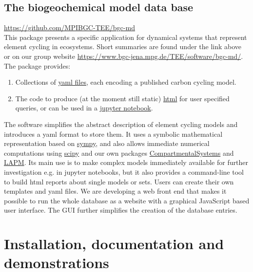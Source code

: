 \documentclass[a4paper]{article}
\begin{document}
\subsection{The biogeochemical model data base}
\url{https://github.com/MPIBGC-TEE/bgc-md}\\
This package presents a specific application for dynamical systems that represent element cycling in ecosystems.
Short summaries are found under the link above or on our group website \url{https://www.bgc-jena.mpg.de/TEE/software/bgc-md/}.
The package provides: 
\begin{enumerate} 
	\item
	Collections of \href{https://github.com/MPIBGC-TEE/bgc-md/tree/master/bgc_md/data/all_records}{yaml files}, each encoding a published carbon cycling model.  
	
	\item 
		The code to produce (at the moment still static) \href{https://www.bgc-jena.mpg.de/TEE/software/bgc-md/vegetation/list_report_v.html}{html} for user specified queries, or can be used in a \href{https://github.com/MPIBGC-TEE/bgc-md/blob/master/jupyter_notebooks/Examples/how_to_apply_toolkit_to_yaml_model.ipynb}{jupyter notebook}. 
\end{enumerate} 
The software simplifies the abstract description of element cycling models and introduces a yaml format to store them. It uses a symbolic mathematical representation based on \href{http://www.sympy.org/en/index.htmlhttp://www.sympy.org/en/index.html}{sympy}, and also allows immediate numerical computations using \href{https://scipy.org/}{scipy} and our own packages \href{https://github.com/MPIBGC-TEE/CompartmentalSystems}{CompartmentalSystems} and \href{https://github.com/MPIBGC-TEE/LAPM}{LAPM}. 
Its main use is to make complex models immediately available for further investigation e.g. in jupyter notebooks, but it also provides a command-line tool to build html reports about single models or sets. Users can create their own templates and yaml files.
We are developing a web front end that makes it possible to run the whole database as a website with a graphical JavaScript based user interface. The GUI further simplifies the creation of the database entries. 



\section{Installation, documentation and demonstrations}
\end{document}
